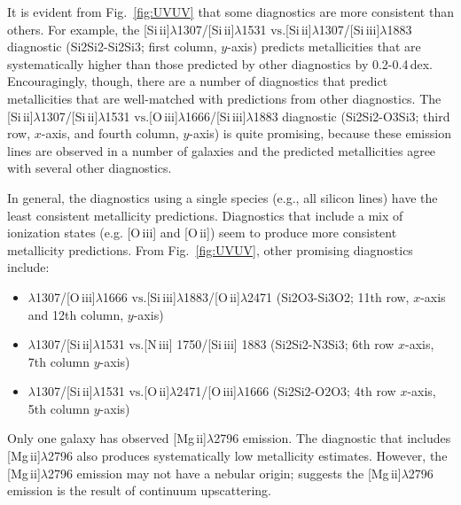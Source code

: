 \documentclass[preprint2]{aastex62}
\newcommand{\niii}{[N\,{\sc iii}]\xspace}
\newcommand{\oiii}{[O\,{\sc iii}]\xspace}
\newcommand{\oii}{[O\,{\sc ii}]\xspace}
\newcommand{\SiuII}{[Si\,{\sc ii}]\xspace}
\newcommand{\SiuIII}{[Si\,{\sc iii}]\xspace}
\newcommand{\mgii}{[Mg\,{\sc ii}]\xspace}
\newcommand\vs{\ensuremath{\mathrm{vs.}}\xspace}
\begin{document}
It is evident from Fig.~\ref{fig:UVUV} that some diagnostics are more consistent than others. For example, the \SiuII$\lambda$1307/\SiuII$\lambda$1531 \vs \SiuII$\lambda$1307/\SiuIII$\lambda$1883 diagnostic (Si2Si2-Si2Si3; first column, $y$-axis) predicts metallicities that are systematically higher than those predicted by other diagnostics by 0.2-0.4\,dex. Encouragingly, though, there are a number of diagnostics that predict metallicities that are well-matched with predictions from other diagnostics. The \SiuII$\lambda$1307/\SiuII$\lambda$1531 \vs \oiii$\lambda$1666/\SiuIII$\lambda$1883 diagnostic (Si2Si2-O3Si3; third row, $x$-axis, and fourth column, $y$-axis) is quite promising, because these emission lines are observed in a number of galaxies and the predicted metallicities agree with several other diagnostics.

In general, the diagnostics using a single species (e.g., all silicon lines) have the least consistent metallicity predictions. Diagnostics that include a mix of ionization states (e.g. \oiii and \oii) seem to produce more consistent metallicity predictions. From Fig.~\ref{fig:UVUV}, other promising diagnostics include:
\begin{itemize}
    \item \SiuII$\lambda$1307/\oiii$\lambda$1666 \vs \SiuIII$\lambda$1883/\oii$\lambda$2471 (Si2O3-Si3O2; 11th row, $x$-axis and 12th column, $y$-axis)
    \item \SiuII$\lambda$1307/\SiuII$\lambda$1531 \vs \niii1750/\SiuIII1883 (Si2Si2-N3Si3; 6th row $x$-axis, 7th column $y$-axis)
    \item \SiuII$\lambda$1307/\SiuII$\lambda$1531 \vs \oii$\lambda$2471/\oiii$\lambda$1666 (Si2Si2-O2O3; 4th row $x$-axis, 5th column $y$-axis)
\end{itemize}

Only one galaxy has observed \mgii$\lambda$2796 emission. The diagnostic that includes \mgii$\lambda$2796 also produces systematically low metallicity estimates. However, the \mgii$\lambda$2796 emission may not have a nebular origin; \citet{Rigby+2018a} suggests the \mgii$\lambda$2796 emission is the result of continuum upscattering.
\end{document}
